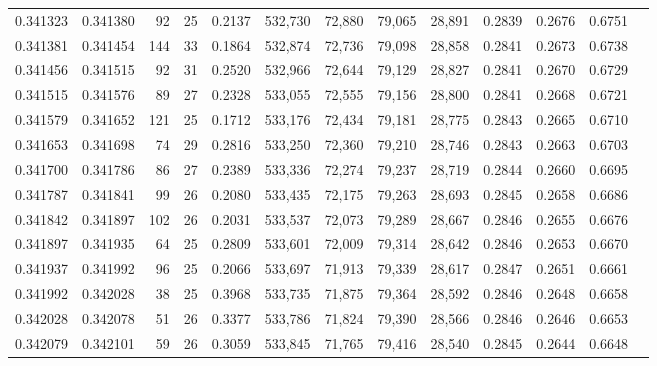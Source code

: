 \begin{tabular}{rrrrrrrrrrrrr}
0.341323 & 0.341380 &    92 &  25 &                                     0.2137 & 532,730 &  72,880 &  79,065 &  28,891 & 0.2839 & 0.2676 & 0.6751 \\
0.341381 & 0.341454 &   144 &  33 &                                     0.1864 & 532,874 &  72,736 &  79,098 &  28,858 & 0.2841 & 0.2673 & 0.6738 \\
0.341456 & 0.341515 &    92 &  31 &                                     0.2520 & 532,966 &  72,644 &  79,129 &  28,827 & 0.2841 & 0.2670 & 0.6729 \\
0.341515 & 0.341576 &    89 &  27 &                                     0.2328 & 533,055 &  72,555 &  79,156 &  28,800 & 0.2841 & 0.2668 & 0.6721 \\
0.341579 & 0.341652 &   121 &  25 &                                     0.1712 & 533,176 &  72,434 &  79,181 &  28,775 & 0.2843 & 0.2665 & 0.6710 \\
0.341653 & 0.341698 &    74 &  29 &                                     0.2816 & 533,250 &  72,360 &  79,210 &  28,746 & 0.2843 & 0.2663 & 0.6703 \\
0.341700 & 0.341786 &    86 &  27 &                                     0.2389 & 533,336 &  72,274 &  79,237 &  28,719 & 0.2844 & 0.2660 & 0.6695 \\
0.341787 & 0.341841 &    99 &  26 &                                     0.2080 & 533,435 &  72,175 &  79,263 &  28,693 & 0.2845 & 0.2658 & 0.6686 \\
0.341842 & 0.341897 &   102 &  26 &                                     0.2031 & 533,537 &  72,073 &  79,289 &  28,667 & 0.2846 & 0.2655 & 0.6676 \\
0.341897 & 0.341935 &    64 &  25 &                                     0.2809 & 533,601 &  72,009 &  79,314 &  28,642 & 0.2846 & 0.2653 & 0.6670 \\
0.341937 & 0.341992 &    96 &  25 &                                     0.2066 & 533,697 &  71,913 &  79,339 &  28,617 & 0.2847 & 0.2651 & 0.6661 \\
0.341992 & 0.342028 &    38 &  25 &                                     0.3968 & 533,735 &  71,875 &  79,364 &  28,592 & 0.2846 & 0.2648 & 0.6658 \\
0.342028 & 0.342078 &    51 &  26 &                                     0.3377 & 533,786 &  71,824 &  79,390 &  28,566 & 0.2846 & 0.2646 & 0.6653 \\
0.342079 & 0.342101 &    59 &  26 &                                     0.3059 & 533,845 &  71,765 &  79,416 &  28,540 & 0.2845 & 0.2644 & 0.6648 \\

\end{tabular}
